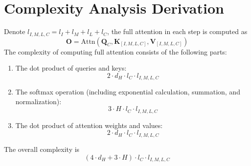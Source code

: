 
\section{Complexity Analysis Derivation}
\label{sec:Complexity_Analysis_Proof}


Denote $l_{I,M,L,C} = l_{I} + l_{M} + l_{L} + l_{C}$, the full attention in each step is computed as
\begin{equation} \label{attention_eq_full}
	\mathbf{O} = \text{Attn}(\mathbf{Q}_C,\mathbf{K}_{[I,M,L,C]}, \mathbf{V}_{[I,M,L,C]})
\end{equation}
The complexity of computing full attention consists of the following parts: 
\begin{enumerate}
\item The dot product of queries and keys: 
\begin{equation} \label{attn_comple_dot}
  2 \cdot d_{H} \cdot l_{C} \cdot l_{I,M,L,C} 
\end{equation}
\item The softmax operation (including exponential calculation, summation, and normalization): 
\begin{equation} \label{attn_comple_softmax}
  3 \cdot H \cdot l_{C} \cdot l_{I,M,L,C}
\end{equation}
\item The dot product of attention weights and values: 
\begin{equation} \label{attn_comple_wei_val}
  2 \cdot d_{H} \cdot l_{C} \cdot l_{I,M,L,C}
\end{equation}
\end{enumerate}

The overall complexity is
\begin{equation} \label{attn_full}
  (4 \cdot d_{H} + 3 \cdot H) \cdot l_{C} \cdot l_{I,M,L,C} 
\end{equation}

